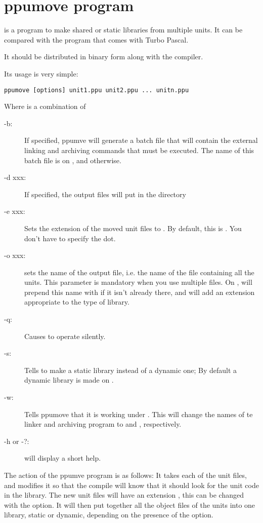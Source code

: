 \section{ppumove program}

 is a program to make shared or static libraries from
multiple units. It can be compared with the  program that
comes with
Turbo Pascal.

It should be distributed in binary form along with the compiler.

Its usage is very simple:
\begin{verbatim}
ppumove [options] unit1.ppu unit2.ppu ... unitn.ppu
\end{verbatim}
Where  is a combination of
\begin{description}
\item[-b:\ ] If specified, ppumve will generate a batch file that will
contain the external linking and archiving commands that must be
executed. The name of this batch file is  on \linux, and
 otherwise.
\item[-d xxx:\ ] If specified, the output files will put in the directory
\item[-e xxx:\ ] Sets the extension of the moved unit files to .
By default, this is . You don't have to specify the dot.
\item[-o xxx:\ ] sets the name of the output file, i.e. the name of the file
containing all the units. This parameter is mandatory when you use multiple
files. On \linux,  will prepend this name with  if it isn't
already there, and will add an extension appropriate to the type of library.
\item [-q:\ ] Causes  to operate silently.
\item [-s:\ ] Tells  to make a static library instead of a
dynamic one; By default a dynamic library is made on \linux.
\item [-w:\ ] Tells ppumove that it is working under \windowsnt. This will
change the names of te linker and archiving program to  and
, respectively.
\item[-h or -?:\ ] will display a short help.
\end{description}

The action of the ppumve program is as follows:
It takes each of the unit files, and modifies it so that the compile will
know that it should look for the unit code in the library. The new unit
files will have an extension , this can be changed with the
 option. It will then put together all the object files of the units
into one library, static or dynamic, depending on the presence of the
 option.

